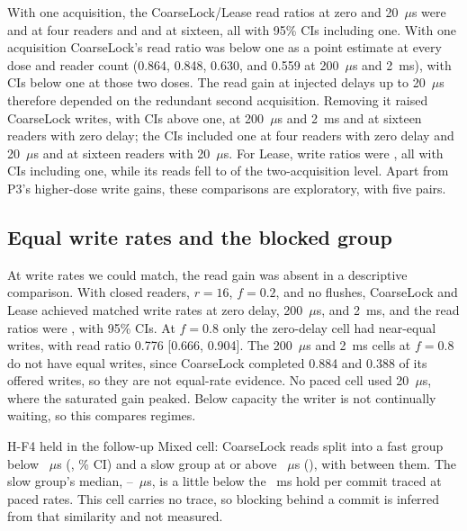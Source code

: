 \documentclass[conference]{IEEEtran}
\begin{document}
With one acquisition, the CoarseLock/Lease read ratios at zero and 20~$\mu$s were \LowDoseReadFourZero{} and \LowDoseReadFourTwenty{} at four readers and \LowDoseReadSixteenZero{} and \LowDoseReadSixteenTwenty{} at sixteen, all with 95\% CIs including one. With one acquisition CoarseLock's read ratio was below one as a point estimate at every dose and reader count (0.864, 0.848, 0.630, and 0.559 at 200~$\mu$s and 2~ms), with CIs below one at those two doses. The read gain at injected delays up to 20~$\mu$s therefore depended on the redundant second acquisition. Removing it raised CoarseLock writes, with CIs above one, at 200~$\mu$s and 2~ms and at sixteen readers with zero delay; the CIs included one at four readers with zero delay and 20~$\mu$s and at sixteen readers with 20~$\mu$s. For Lease, write ratios were \IntLeaseWriteRange{}, all with CIs including one, while its reads fell to \IntLeaseReadRange{} of the two-acquisition level. Apart from P3's higher-dose write gains, these comparisons are exploratory, with five pairs.

\subsection{Equal write rates and the blocked group}
At write rates we could match, the read gain was absent in a descriptive comparison. With closed readers, $r=16$, $f=0.2$, and no flushes, CoarseLock and Lease achieved matched write rates at zero delay, 200~$\mu$s, and 2~ms, and the read ratios were \PacedReadLowClosed{}, with 95\% CIs. At $f=0.8$ only the zero-delay cell had near-equal writes, with read ratio 0.776 [0.666, 0.904]. The 200~$\mu$s and 2~ms cells at $f=0.8$ do not have equal writes, since CoarseLock completed 0.884 and 0.388 of its offered writes, so they are not equal-rate evidence. No paced cell used 20~$\mu$s, where the saturated gain peaked. Below capacity the writer is not continually waiting, so this compares regimes.

H-F4 held in the follow-up Mixed cell: CoarseLock reads split into a fast group below \FollowFastBound{}~$\mu$s (\FollowFastA{}, \FollowRegionCI{}\% CI) and a slow group at or above \FollowBlockedBound{}~$\mu$s (\FollowBlockedA{}), with \FollowValleyA{} between them. The slow group's median, \FollowSlowLow{}--\FollowSlowHigh{}~$\mu$s, is a little below the \HoldMsRange{}~ms hold per commit traced at paced rates. This cell carries no trace, so blocking behind a commit is inferred from that similarity and not measured.
\end{document}

